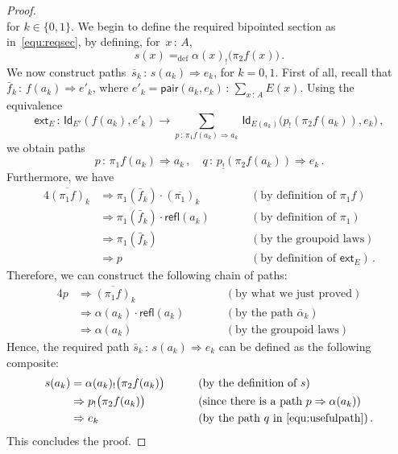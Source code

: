 \documentclass[10pt,a4paper,oneside,reqno]{amsart}
\theoremstyle{mythm}
\theoremstyle{mydef}
\theoremstyle{myrmk}
\newcommand{\deq}{=}
\newcommand{\defeq}{=_{\mathrm{def}}}
\newcommand{\co}{\,{:}\,}
\newcommand{\ct}{\cdot}
\newcommand{\ext}{\mathsf{ext}}
\newcommand{\Id}{\mathsf{Id}}
\newcommand{\refl}{\mathsf{refl}}
\newcommand{\pair}{\mathsf{pair}}
\begin{document}
\begin{proof}
\begin{equation*}
\end{equation*}
for $k \in \{ 0, 1 \}$. We begin to define the required bipointed section as in~\eqref{equ:reqsec}, by defining, for~$x \co A$, 
\begin{equation}
\label{equ:defreqsection}
s(x) \defeq \alpha(x)_{!} \big( \pi_2 f (x) \big) \, .
\end{equation}
We now construct  paths~$\bar{s}_k \co s(a_k) \Rightarrow e_k$, for $k = 0, 1$. First of all, recall that 
$\bar{f}_k \co  f(a_k) \Rightarrow  e'_k$, where $e'_k = \pair(a_k, e_k) \co \sum_{x \co A} E(x)$. Using the equivalence
\[
\ext_E \co \Id_{E'}( f(a_k), e'_k) \longrightarrow \sum_{p \co  \pi_1 f(a_k) \Rightarrow a_k} \, \Id_{E(a_k)} \big( p_{!}( \pi_2 f(a_k)) , e_k \big) \, ,
\]
we obtain paths 
\begin{equation}
\label{equ:usefulpath}
p \co   \pi_1 f (a_k) \Rightarrow a_k  \, , \quad q \co   p_{!}( \pi_2 f (a_k)) \Rightarrow e_k   \, .
\end{equation}
Furthermore, we have 
\begin{alignat*}{4}  
\overline{(\pi_1 f)}_k  & \Rightarrow \pi_1(\bar{f}_k) \ct (\overline{\pi_1})_k & & \qquad (\text{by definition of } \pi_1 f)   \\
& \Rightarrow \pi_1(\bar{f}_k) \ct \refl(a_k) & & \qquad (\text{by definition of } \pi_1)  \\
 & \Rightarrow \pi_1(\bar{f}_k) & & \qquad (\text{by the groupoid laws}) \\
 & \Rightarrow p  & & \qquad (\text{by definition of } \ext_E) \,  .
\end{alignat*}
Therefore, we can construct the following chain of paths:
\begin{alignat*}{4}
p & \Rightarrow  \overline{(\pi_1 f)}_k & &  \qquad (\text{by what we just proved})  \\
  & \Rightarrow  \alpha(a_k) \ct \refl(a_k) & &  \qquad (\text{by the path } \bar{\alpha}_k ) \\ 
  & \Rightarrow  \alpha(a_k)  & & \qquad (\text{by the groupoid laws})
\end{alignat*} 
Hence,  the required path $\bar{s}_k \co  s(a_k) \Rightarrow e_k$ can be defined as the following composite:
\begin{alignat*}{4}
s(a_k) & \deq \alpha(a_k)_{!} \big( \pi_2 f(a_k)  \big) & & \qquad (\text{by the definition of } s) \\
 &              \Rightarrow   p_{!} \big( \pi_2 f(a_k)  \big) & & \qquad (\text{since there is a path } p \Rightarrow \alpha(a_k)) \\
   &            \Rightarrow  e_k  & &  \qquad (\text{by the path } q \text{ in } \eqref{equ:usefulpath})  \, .
   \end{alignat*} 
   This concludes the proof.
\end{proof}
\end{document}
